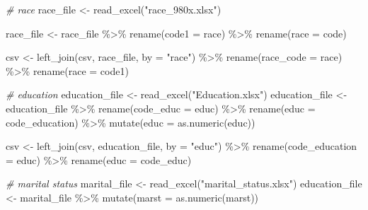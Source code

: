 \documentclass[
]{article}
\newenvironment{Shaded}{\begin{snugshade}}{\end{snugshade}}
\newcommand{\AttributeTok}[1]{\textcolor[rgb]{0.77,0.63,0.00}{#1}}
\newcommand{\CommentTok}[1]{\textcolor[rgb]{0.56,0.35,0.01}{\textit{#1}}}
\newcommand{\FunctionTok}[1]{\textcolor[rgb]{0.00,0.00,0.00}{#1}}
\newcommand{\NormalTok}[1]{#1}
\newcommand{\OtherTok}[1]{\textcolor[rgb]{0.56,0.35,0.01}{#1}}
\newcommand{\SpecialCharTok}[1]{\textcolor[rgb]{0.00,0.00,0.00}{#1}}
\newcommand{\StringTok}[1]{\textcolor[rgb]{0.31,0.60,0.02}{#1}}
\begin{document}
\begin{Shaded}
\begin{Highlighting}[]
\CommentTok{\# race }
\NormalTok{race\_file }\OtherTok{\textless{}{-}} \FunctionTok{read\_excel}\NormalTok{(}\StringTok{"race\_980x.xlsx"}\NormalTok{)}

\NormalTok{race\_file }\OtherTok{\textless{}{-}}\NormalTok{ race\_file }\SpecialCharTok{\%\textgreater{}\%}
  \FunctionTok{rename}\NormalTok{(}\AttributeTok{code1 =}\NormalTok{ race) }\SpecialCharTok{\%\textgreater{}\%}
  \FunctionTok{rename}\NormalTok{(}\AttributeTok{race =}\NormalTok{ code) }

\NormalTok{csv }\OtherTok{\textless{}{-}} \FunctionTok{left\_join}\NormalTok{(csv, race\_file, }\AttributeTok{by =} \StringTok{"race"}\NormalTok{) }\SpecialCharTok{\%\textgreater{}\%}
  \FunctionTok{rename}\NormalTok{(}\AttributeTok{race\_code =}\NormalTok{ race) }\SpecialCharTok{\%\textgreater{}\%}
  \FunctionTok{rename}\NormalTok{(}\AttributeTok{race =}\NormalTok{ code1)}


\CommentTok{\# education}
\NormalTok{education\_file }\OtherTok{\textless{}{-}} \FunctionTok{read\_excel}\NormalTok{(}\StringTok{"Education.xlsx"}\NormalTok{)}
\NormalTok{education\_file }\OtherTok{\textless{}{-}}\NormalTok{ education\_file }\SpecialCharTok{\%\textgreater{}\%}
  \FunctionTok{rename}\NormalTok{(}\AttributeTok{code\_educ =}\NormalTok{ educ) }\SpecialCharTok{\%\textgreater{}\%}
  \FunctionTok{rename}\NormalTok{(}\AttributeTok{educ =}\NormalTok{ code\_education) }\SpecialCharTok{\%\textgreater{}\%}
  \FunctionTok{mutate}\NormalTok{(}\AttributeTok{educ =} \FunctionTok{as.numeric}\NormalTok{(educ))}

\NormalTok{csv }\OtherTok{\textless{}{-}} \FunctionTok{left\_join}\NormalTok{(csv, education\_file, }\AttributeTok{by =} \StringTok{"educ"}\NormalTok{) }\SpecialCharTok{\%\textgreater{}\%}
  \FunctionTok{rename}\NormalTok{(}\AttributeTok{code\_education =}\NormalTok{ educ) }\SpecialCharTok{\%\textgreater{}\%}
  \FunctionTok{rename}\NormalTok{(}\AttributeTok{educ =}\NormalTok{ code\_educ) }

\CommentTok{\# marital status}
\NormalTok{marital\_file }\OtherTok{\textless{}{-}} \FunctionTok{read\_excel}\NormalTok{(}\StringTok{"marital\_status.xlsx"}\NormalTok{)}
\NormalTok{education\_file }\OtherTok{\textless{}{-}}\NormalTok{ marital\_file }\SpecialCharTok{\%\textgreater{}\%}
  \FunctionTok{mutate}\NormalTok{(}\AttributeTok{marst =} \FunctionTok{as.numeric}\NormalTok{(marst))}
  

\end{Highlighting}
\end{Shaded}
\end{document}
